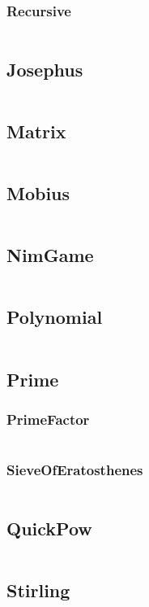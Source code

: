 \documentclass[a4paper,11pt]{article}
\begin{document}
\subsubsection{Recursive}
\inputminted[breaklines]{c++}{Math/+InverseElement/+Recursive.cpp}

\subsection{Josephus}
\inputminted[breaklines]{c++}{Math/+Josephus.cpp}
\subsection{Matrix}
\inputminted[breaklines]{c++}{Math/+Matrix.cpp}
\subsection{Mobius}
\inputminted[breaklines]{c++}{Math/+Mobius.cpp}
\subsection{NimGame}
\inputminted[breaklines]{c++}{Math/+NimGame.cpp}
\subsection{Polynomial}
\inputminted[breaklines]{c++}{Math/+Polynomial.cpp}
\subsection{Prime}
\subsubsection{PrimeFactor}
\inputminted[breaklines]{c++}{Math/+Prime/+PrimeFactor.cpp}
\subsubsection{SieveOfEratosthenes}
\inputminted[breaklines]{c++}{Math/+Prime/+SieveOfEratosthenes.cpp}

\subsection{QuickPow}
\inputminted[breaklines]{c++}{Math/+QuickPow.cpp}
\subsection{Stirling}
\inputminted[breaklines]{c++}{Math/+Stirling.cpp}
\end{document}
